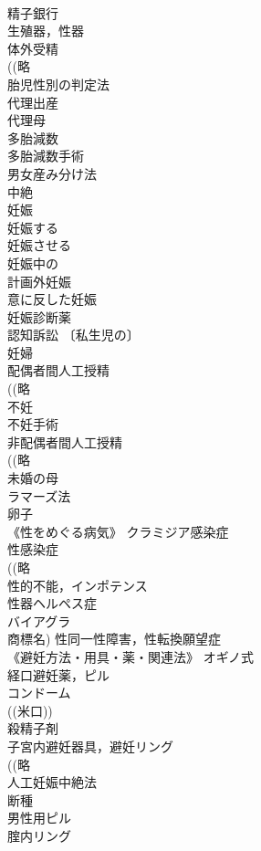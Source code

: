 \documentclass[8pt]{extreport}
\begin{document}
\begin{CJK}{UTF8}{min}
\\	精子銀行 
\\	生殖器，性器 
\\	体外受精 
\\	((略
\\	胎児性別の判定法 
\\	代理出産 
\\	代理母 
\\	多胎減数 
\\	多胎減数手術 
\\	男女産み分け法 
\\	中絶 
\\	妊娠 
\\	妊娠する 
\\	妊娠させる 
\\	妊娠中の 
\\	計画外妊娠 
\\	意に反した妊娠 
\\	妊娠診断薬 
\\	認知訴訟 〔私生児の〕
\\	妊婦 
\\	配偶者間人工授精 
\\	((略
\\	不妊 
\\	不妊手術 
\\	非配偶者間人工授精 
\\	((略
\\	未婚の母 
\\	ラマーズ法 
\\	卵子 
\\	《性をめぐる病気》 クラミジア感染症 
\\	性感染症 
\\	((略
\\	性的不能，インポテンス 
\\	性器ヘルペス症 
\\	バイアグラ 
\\	商標名) 性同一性障害，性転換願望症 
\\	《避妊方法・用具・薬・関連法》 オギノ式 
\\	経口避妊薬，ピル 
\\	コンドーム 
\\	((米口))
\\	殺精子剤 
\\	子宮内避妊器具，避妊リング 
\\	((略
\\	人工妊娠中絶法 
\\	断種 
\\	男性用ピル 
\\	腟内リング 

\end{CJK}
\end{document}
